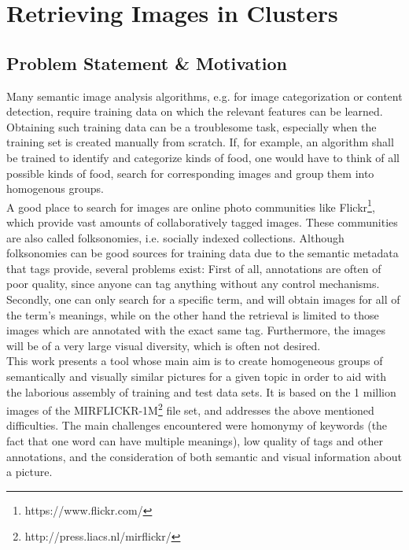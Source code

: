 \section{Retrieving Images in Clusters}
\label{sec_introduction}


\subsection{Problem Statement \& Motivation}
Many semantic image analysis algorithms, e.g. for image categorization or content detection, require training data on which the relevant features can be learned. Obtaining such training data can be a troublesome task, especially when the training set is created manually from scratch. If, for example, an algorithm shall be trained to identify and categorize kinds of food, one would have to think of all possible kinds of food, search for corresponding images and group them into homogenous groups. \\
A good place to search for images are online photo communities like Flickr\footnote{https://www.flickr.com/}, which provide vast amounts of collaboratively tagged images. These communities are also called folksonomies, i.e. socially indexed collections.
Although folksonomies can be good sources for training data due to the semantic metadata that tags provide, several problems exist: First of all, annotations are often of poor quality, since anyone can tag anything without any control mechanisms. Secondly, one can only search for a specific term, and will obtain images for all of the term's meanings, while on the other hand the retrieval is limited to those images which are annotated with the exact same tag. Furthermore, the images will be of a very large visual diversity, which is often not desired. \\

This work presents a tool whose main aim is to create homogeneous groups of semantically and visually similar pictures for a given topic in order to aid with the laborious assembly of training and test data sets. It is based on the 1 million images of the MIRFLICKR-1M\footnote{http://press.liacs.nl/mirflickr/} file set, and addresses the above mentioned difficulties. The main challenges encountered were homonymy of keywords (the fact that one word can have multiple meanings), low quality of tags and other annotations, and the consideration of both semantic and visual information about a picture.

